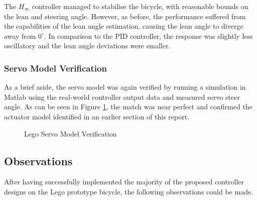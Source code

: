 The $H_{\infty}$ controller managed to stabilise the bicycle, with reasonable bounds on the lean and steering angle. However, as before, the performance suffered from the capabilities of the lean angle estimation, causing the lean angle to diverge away from $0^{\circ}$. In comparison to the PID controller, the response was slightly less oscillatory and the lean angle deviations were smaller.

\subsubsection{Servo Model Verification}
As a brief aside, the servo model was again verified by running a simulation in Matlab using the real-world controller output data and measured servo steer angle. As can be seen in Figure \ref{fig:LegoServoIDPart2}, the match was near perfect and confirmed the actuator model identified in an earlier section of this report. \\

\begin{figure}[H]
\centering
{}
	\caption{Lego Servo Model Verification}
	\label{fig:LegoServoIDPart2}
\end{figure}

\subsection{Observations}
After having successfully implemented the majority of the proposed controller designs on the Lego prototype bicycle, the following observations could be made.

